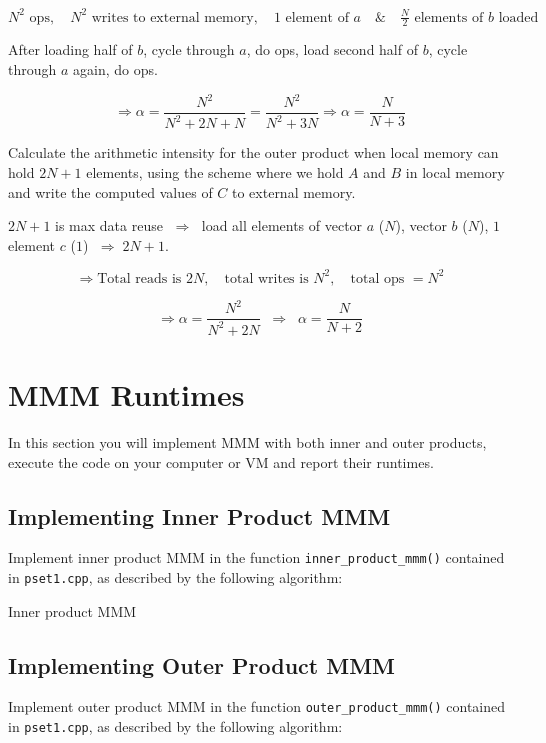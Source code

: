 \documentclass[a4 paper]{article}
\begin{document}

\[
N^2 \text{ ops}, \quad N^2 \text{ writes to external memory}, \quad 
1 \text{ element of } a \quad \& \quad \tfrac{N}{2} \text{ elements of } b \text{ loaded}
\]

After loading half of $b$, cycle through $a$, do ops, load second half of $b$, 
cycle through $a$ again, do ops.

\[
\Rightarrow \alpha = \frac{N^2}{N^2 + 2N + N}
= \frac{N^2}{N^2 + 3N}
\Rightarrow \alpha = \frac{N}{N+3}
\]

Calculate the arithmetic intensity for the outer product when local memory can hold $2N + 1$ elements, using the scheme where we hold $A$ and $B$ in local memory and write the computed values of $C$ to external memory.


$2N+1$ is max data reuse $\;\Rightarrow\;$ load all elements of vector $a$ ($N$), 
vector $b$ ($N$), $1$ element $c$ ($1$) $\;\Rightarrow\; 2N+1$.

\[
\Rightarrow \text{Total reads is } 2N, \quad 
\text{total writes is } N^2, \quad 
\text{total ops } = N^2
\]

\[
\Rightarrow \alpha = \frac{N^2}{N^2 + 2N} 
\;\;\Rightarrow\;\; 
\alpha = \frac{N}{N+2}
\]


\newpage
\section{MMM Runtimes}
\label{sec:eval}
In this section you will implement MMM with both inner and outer products, execute the code on your computer or VM and report their runtimes.

\subsection*{Implementing Inner Product MMM}
Implement inner product MMM in the function \texttt{inner\_product\_mmm()} contained in \texttt{pset1.cpp}, as described by the following algorithm:
\begin{algorithm}
\SetAlgoLined
\SetInd{0.25em}{0.5em}
\caption{Inner product MMM}
\label{algo:naivemm-mnk}
\end{algorithm}

\subsection*{Implementing Outer Product MMM}
Implement outer product MMM in the function \texttt{outer\_product\_mmm()} contained in \texttt{pset1.cpp}, as described by the following algorithm:
\end{document}
